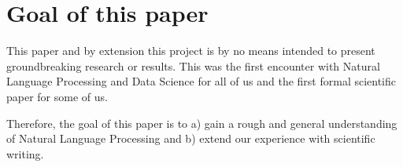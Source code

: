 \section*{Goal of this paper}
This paper and by extension this project is by no means intended to present groundbreaking research or results. This was the first encounter with Natural Language Processing and Data Science for all of us and the first formal scientific paper for some of us.

Therefore, the goal of this paper is to a) gain a rough and general understanding of Natural Language Processing and b) extend our experience with scientific writing. 